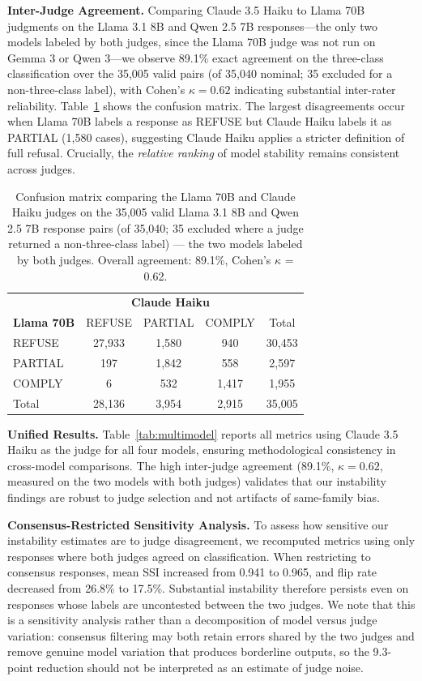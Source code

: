 \documentclass[11pt]{article}
\begin{document}
\textbf{Inter-Judge Agreement.} Comparing Claude 3.5 Haiku to Llama 70B judgments on the Llama 3.1 8B and Qwen 2.5 7B responses---the only two models labeled by both judges, since the Llama 70B judge was not run on Gemma 3 or Qwen 3---we observe 89.1\% exact agreement on the three-class classification over the 35,005 valid pairs (of 35,040 nominal; 35 excluded for a non-three-class label), with Cohen's $\kappa = 0.62$ indicating substantial inter-rater reliability. Table~\ref{tab:confusion_matrix} shows the confusion matrix. The largest disagreements occur when Llama 70B labels a response as REFUSE but Claude Haiku labels it as PARTIAL (1,580 cases), suggesting Claude Haiku applies a stricter definition of full refusal. Crucially, the \textit{relative ranking} of model stability remains consistent across judges.

\begin{table}[h]
\centering
\caption{Confusion matrix comparing the Llama 70B and Claude Haiku judges on the 35,005 valid Llama 3.1 8B and Qwen 2.5 7B response pairs (of 35,040; 35 excluded where a judge returned a non-three-class label) --- the two models labeled by both judges. Overall agreement: 89.1\%, Cohen's $\kappa$ = 0.62.}
\label{tab:confusion_matrix}
\begin{tabular}{lccc|c}
\toprule
& \multicolumn{3}{c}{\textbf{Claude Haiku}} & \\
\textbf{Llama 70B} & REFUSE & PARTIAL & COMPLY & Total \\
\midrule
REFUSE & 27,933 & 1,580 & 940 & 30,453 \\
PARTIAL & 197 & 1,842 & 558 & 2,597 \\
COMPLY & 6 & 532 & 1,417 & 1,955 \\
\midrule
Total & 28,136 & 3,954 & 2,915 & 35,005 \\
\bottomrule
\end{tabular}
\end{table}

\textbf{Unified Results.} Table~\ref{tab:multimodel} reports all metrics using Claude 3.5 Haiku as the judge for all four models, ensuring methodological consistency in cross-model comparisons. The high inter-judge agreement (89.1\%, $\kappa = 0.62$, measured on the two models with both judges) validates that our instability findings are robust to judge selection and not artifacts of same-family bias.

\textbf{Consensus-Restricted Sensitivity Analysis.} To assess how sensitive our instability estimates are to judge disagreement, we recomputed metrics using only responses where both judges agreed on classification. When restricting to consensus responses, mean SSI increased from 0.941 to 0.965, and flip rate decreased from 26.8\% to 17.5\%. Substantial instability therefore persists even on responses whose labels are uncontested between the two judges. We note that this is a sensitivity analysis rather than a decomposition of model versus judge variation: consensus filtering may both retain errors shared by the two judges and remove genuine model variation that produces borderline outputs, so the 9.3-point reduction should not be interpreted as an estimate of judge noise.
\end{document}
